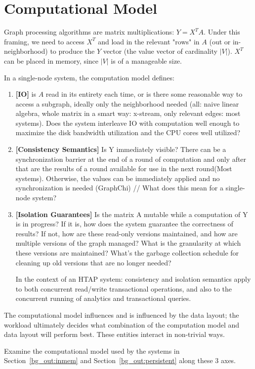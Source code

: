 \section{Computational Model}
	
Graph processing algorithms are matrix multiplications: $Y = X^TA$. Under this framing, we need to access $X^T$ and load in the relevant "rows" in $A$ (out or in-neighborhood) to produce the $Y$ vector (the value vector of cardinality $|V|$). $X^T$ can be placed in memory, since $|V|$ is of a manageable size.
	
In a single-node system, the computation model defines:
\begin{enumerate}
	\item \textbf{[IO]} is $A$ read in its entirety each time, or is there some reasonable way to access a subgraph, ideally only the neighborhood needed (all: naive linear algebra, whole matrix in a smart way: x-stream, only relevant edges: most systems). Does the system interleave IO with computation well enough to maximize the disk bandwidth utilization and the CPU cores well utilized?

	\item\textbf{[Consistency Semantics]} Is Y immediately visible? There can be a synchronization barrier at the end of a round of computation and only after that are the results of a round available for use in the next round(Most systems). Otherwise, the values can be immediately applied and no synchronization is needed (GraphChi) // What does this mean for a single-node system?
	
	\item\textbf{[Isolation Guarantees]} Is the matrix A mutable while a computation of Y is in progress? If it is, how does the system guarantee the correctness of results? If not, how are these read-only versions maintained, and how are multiple versions of the graph managed? What is the granularity at which these versions are maintained? What's the garbage collection schedule for cleaning up old versions that are no longer needed?
	
	In the context of an HTAP system: consistency and isolation semantics apply to both concurrent read/write transactional operations, and also to the concurrent running of analytics and transactional queries.

\end{enumerate}

The computational model influences and is influenced by the data layout; the workload ultimately decides what combination of the computation model and data layout will perform best.
These entities interact in non-trivial ways. 

Examine the computational model used by the systems in Section~\autoref{bg_out:inmem} and Section~\autoref{bg_out:persistent} along these 3 axes.